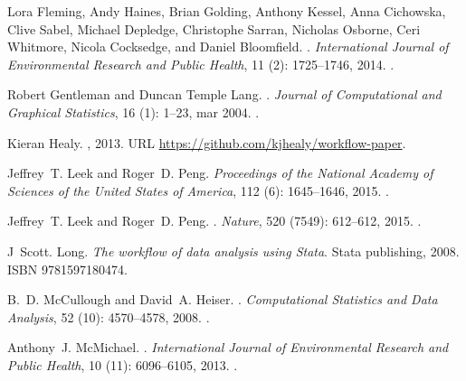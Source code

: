 \documentclass[11pt,a4paper]{article}
\begin{document}
\begin{thebibliography}{30}
Lora Fleming, Andy Haines, Brian Golding, Anthony Kessel, Anna Cichowska, Clive
  Sabel, Michael Depledge, Christophe Sarran, Nicholas Osborne, Ceri Whitmore,
  Nicola Cocksedge, and Daniel Bloomfield.
.
\newblock \emph{International Journal of Environmental Research and Public
  Health}, 11 (2): 1725--1746, 2014.
\newblock {}.

Robert Gentleman and Duncan {Temple Lang}.
.
\newblock \emph{Journal of Computational and Graphical Statistics}, 16
  (1): 1--23, mar 2004.
\newblock {}.

Kieran Healy.
, 2013.
\newblock URL \url{https://github.com/kjhealy/workflow-paper}.

Jeffrey~T. Leek and Roger~D. Peng.
\newblock \emph{Proceedings of the National Academy of Sciences of the United
  States of America}, 112 (6): 1645--1646,
  2015{}.
\newblock {}.

Jeffrey~T. Leek and Roger~D. Peng.
.
\newblock \emph{Nature}, 520 (7549): 612--612,
  2015{}.
\newblock {}.

J~Scott. Long.
\newblock \emph{{The workflow of data analysis using Stata}}.
\newblock Stata publishing, 2008.
\newblock ISBN 9781597180474.

B.~D. McCullough and David~A. Heiser.
.
\newblock \emph{Computational Statistics and Data Analysis}, 52
  (10): 4570--4578, 2008.
\newblock {}.

Anthony~J. McMichael.
.
\newblock \emph{International Journal of Environmental Research and Public
  Health}, 10 (11): 6096--6105, 2013.
\newblock {}.


\end{thebibliography}
\end{document}
